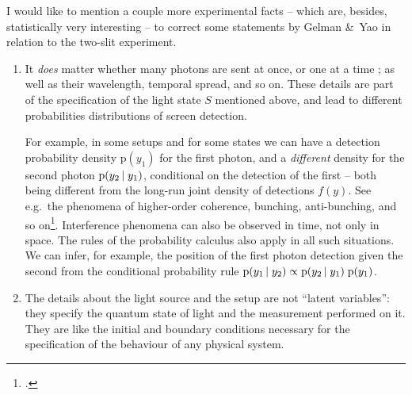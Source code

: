 \documentclass[\ifafour a4paper,12pt,\else a5paper,10pt,\fi%
onecolumn,oneside,article,%
british%
]{memoir}
\theoremstyle{remark}
\theoremstyle{innote}
\newcommand*{\citep}{\parencites}%
\newcommand*{\amp}{\&}
\newcommand*{\pf}{\mathrm{p}}%
\renewcommand*{\|}[1][]{\nonscript\,#1\vert\nonscript\;\mathopen{}}
\newcommand*{\sect}{\S}%
\newcommand*{\eg}{{e.g.}}
\newcommand*{\cf}{{cf.}}
\begin{document}
I would like to mention a couple more experimental facts -- which are,
besides, statistically very interesting -- to correct some statements by
Gelman \amp\ Yao in relation to the two-slit experiment.

\begin{enumerate}[label=(\textbf{\roman*})]
\item\label{item:q_details} It \emph{does} matter whether many photons are
  sent at once, or one at a time \citep[\cf][\sect~2
  point~1]{gelmanetal2020}; as well as their wavelength, temporal spread,
  and so on. These details are part of the specification of the light state
  $S$ mentioned above, and lead to different probabilities distributions of
  screen detection.

  For example, in some setups and for some states we can have a detection
  probability density $\pf(y_{1})$ for the first photon, and a
  \emph{different} density for the second photon $\pf(y_{2} \| y_{1})$,
  conditional on the detection of the first -- both being different from
  the long-run joint density of detections $f(y)$. See \eg\ the phenomena
  of higher-order coherence, bunching, anti-bunching, and so
  on\footcites[\eg][]{mandeletal1965,morganetal1966,paul1982,jacobsonetal1995}[and
  textbooks such
  as][]{loudon1973_r2000,mandeletal1995_r2008,scullyetal1997_r2001,bachoretal1998_r2004,wallsetal1994}.
  Interference phenomena can also be observed in time, not only in space.
  The rules of the probability calculus also apply in all such situations.
  We can infer, for example, the position of the first photon detection
  given the second from the conditional probability rule
  $\pf(y_{1} \| y_{2}) \propto \pf(y_{2} \| y_{1})\;\pf(y_{1})$.
  

\item\label{item:latent_vars} The details about the light source and the
  setup are not \enquote{latent variables}: they specify the quantum state
  of light and the measurement performed on it. They are like the initial
  and boundary conditions necessary for the specification of the behaviour
  of any physical system. %


\end{enumerate}
\end{document}
